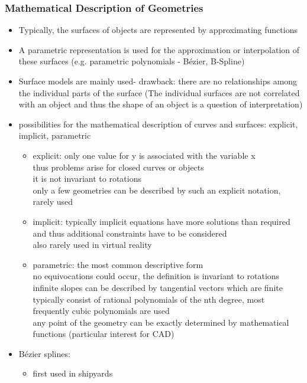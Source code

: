 \documentclass[12pt]{article}
\begin{document}
\subsubsection*{Mathematical Description of Geometries}

\begin{itemize}
	\item Typically, the surfaces of objects are represented by approximating functions
	\item A parametric representation is used for the approximation or interpolation of these surfaces (e.g. parametric polynomials - B\'ezier, B-Spline)
	\item Surface models are mainly used- drawback: there are no relationships among the individual parts of the surface (The individual surfaces are not correlated with an object and thus the shape of an object is a question of interpretation)
	\item possibilities for the mathematical description of curves and surfaces: explicit, implicit, parametric
	\begin{itemize}
		\item explicit: only one value for y is associated with the variable x\\
		thus problems arise for closed curves or objects\\
		it is not invariant to rotations\\
		only a few geometries can be described by such an explicit notation, rarely used
		\item implicit: typically implicit equations have more solutions than required and thus additional constraints have to be considered\\
		also rarely used in virtual reality
		\item parametric: the most common descriptive form\\
		no equivocations could occur, the definition is invariant to rotations\\
		infinite slopes can be described by tangential vectors which are finite\\
		typically consist of rational polynomials of the nth degree, most frequently cubic polynomials are used\\
		any point of the geometry can be exactly determined by mathematical functions (particular interest for CAD)
	\end{itemize}
	\item B\'ezier splines:
	\begin{itemize}
		\item first used in shipyards

\end{itemize}
\end{itemize}
\end{document}

